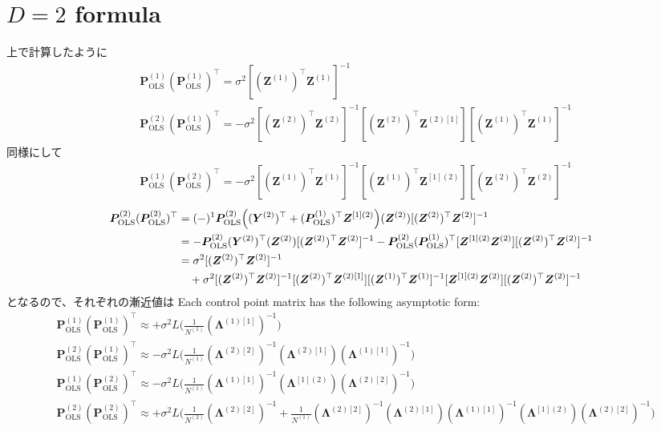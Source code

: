 \documentclass{article}
\begin{document}
\section{$D=2$ formula}
上で計算したように
\begin{align}
&\bm P_\text{OLS}^{(1)}
(\bm P_\text{OLS}^{(1)})^\top
=
\sigma^2 [ (\bm Z^{(1)})^\top \bm Z^{(1)} ]^{-1}
\\
&\bm P_\text{OLS}^{(2)}
(\bm P_\text{OLS}^{(1)})^\top
=
- \sigma^2 [(\bm Z^{(2)})^\top \bm Z^{(2)}]^{-1}
[ (\bm Z^{(2)})^\top \bm Z^{(2)[1]} ]
[ (\bm Z^{(1)})^\top \bm Z^{(1)} ]^{-1}
\end{align}
同様にして
\begin{align}
&\bm P_\text{OLS}^{(1)}
(\bm P_\text{OLS}^{(2)})^\top
=
- \sigma^2 [(\bm Z^{(1)})^\top \bm Z^{(1)}]^{-1}
[ (\bm Z^{(1)})^\top \bm Z^{[1](2)} ]
[ (\bm Z^{(2)})^\top \bm Z^{(2)} ]^{-1}
\end{align}
\begin{align}
\bm P_\text{OLS}^{(2)}
(\bm P_\text{OLS}^{(2)})^\top
&=
(-)^{1}
\bm P_\text{OLS}^{(2)}
\Big( (\bm Y^{(2)})^\top + (\bm P_\text{OLS}^{(1)})^\top \bm Z^{[1](2)}  \Big)
(\bm Z^{(2)})
[(\bm Z^{(2)})^\top \bm Z^{(2)}]^{-1}
\notag \\
&= %
- \bm P_\text{OLS}^{(2)}(\bm Y^{(2)})^\top (\bm Z^{(2)}) [(\bm Z^{(2)})^\top \bm Z^{(2)}]^{-1}
- \bm P_\text{OLS}^{(2)} (\bm P_\text{OLS}^{(1)})^\top [\bm Z^{[1](2)} \bm Z^{(2)}] [(\bm Z^{(2)})^\top \bm Z^{(2)}]^{-1}
\notag \\
&= %
\sigma^2 [(\bm Z^{(2)})^\top \bm Z^{(2)}]^{-1}
\notag \\
&\quad %
+
\sigma^2 
[(\bm Z^{(2)})^\top \bm Z^{(2)}]^{-1}
[ (\bm Z^{(2)})^\top \bm Z^{(2)[1]} ]
[ (\bm Z^{(1)})^\top \bm Z^{(1)} ]^{-1}
[\bm Z^{[1](2)} \bm Z^{(2)}] [(\bm Z^{(2)})^\top \bm Z^{(2)}]^{-1}
\end{align}
となるので、それぞれの漸近値は
\fi
Each control point matrix has the following asymptotic form:
\begin{align}
&
\bm P_\text{OLS}^{(1)}
(\bm P_\text{OLS}^{(1)})^\top
\approx
+
\sigma^2 L \Big(
\frac{1}{N^{(1)}}
(\bm \Lambda ^{(1)[1]})^{-1}
\Big)
\\
&
\bm P_\text{OLS}^{(2)}
(\bm P_\text{OLS}^{(1)})^\top
\approx
- \sigma^2 L \Big(
\frac{1}{N^{(1)}}
(\bm \Lambda ^{(2)[2]})^{-1}
(\bm \Lambda ^{(2)[1]})
(\bm \Lambda ^{(1)[1]})^{-1}
\Big)
\\
&
\bm P_\text{OLS}^{(1)}
(\bm P_\text{OLS}^{(2)})^\top
\approx
- \sigma^2 L \Big(
\frac{1}{N^{(1)}}
(\bm \Lambda ^{(1)[1]})^{-1}
(\bm \Lambda ^{[1](2)})
(\bm \Lambda ^{(2)[2]})^{-1}
\Big)
\\
&
\bm P_\text{OLS}^{(2)}
(\bm P_\text{OLS}^{(2)})^\top
\approx
+
 \sigma^2 L \Big(
 \frac{1}{N^{(2)}} (\bm \Lambda ^{(2)[2]})^{-1}
 +
 \frac{1}{N^{(1)}}
(\bm \Lambda ^{(2)[2]})^{-1}
(\bm \Lambda ^{(2)[1]})
(\bm \Lambda ^{(1)[1]})^{-1}
(\bm \Lambda ^{[1](2)})
(\bm \Lambda ^{(2)[2]})^{-1}
 \Big)
\end{align}
\end{document}
